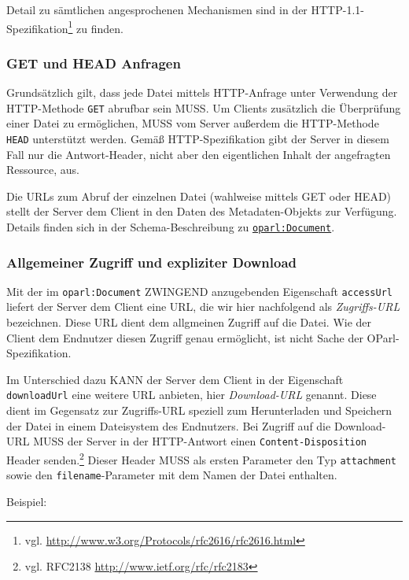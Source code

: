 \documentclass[,a4paper]{article}
\begin{document}
Detail zu sämtlichen angesprochenen Mechanismen sind in der
HTTP-1.1-Spezifikation\footnote{vgl.
  \url{http://www.w3.org/Protocols/rfc2616/rfc2616.html}} zu finden.

\subsubsection{GET und HEAD Anfragen}\label{get-und-head-anfragen}

Grundsätzlich gilt, dass jede Datei mittels HTTP-Anfrage unter
Verwendung der HTTP-Methode \texttt{GET} abrufbar sein MUSS. Um Clients
zusätzlich die Überprüfung einer Datei zu ermöglichen, MUSS vom Server
außerdem die HTTP-Methode \texttt{HEAD} unterstützt werden. Gemäß
HTTP-Spezifikation gibt der Server in diesem Fall nur die
Antwort-Header, nicht aber den eigentlichen Inhalt der angefragten
Ressource, aus.

Die URLs zum Abruf der einzelnen Datei (wahlweise mittels GET oder HEAD)
stellt der Server dem Client in den Daten des Metadaten-Objekts zur
Verfügung. Details finden sich in der Schema-Beschreibung zu
\hyperref[oparlux5fdocument]{\texttt{oparl:Document}}.

\subsubsection{Allgemeiner Zugriff und expliziter
Download}\label{allgemeiner-zugriff-und-expliziter-download}

Mit der im \texttt{oparl:Document} ZWINGEND anzugebenden Eigenschaft
\texttt{accessUrl} liefert der Server dem Client eine URL, die wir hier
nachfolgend als \emph{Zugriffs-URL} bezeichnen. Diese URL dient dem
allgmeinen Zugriff auf die Datei. Wie der Client dem Endnutzer diesen
Zugriff genau ermöglicht, ist nicht Sache der OParl-Spezifikation.

Im Unterschied dazu KANN der Server dem Client in der Eigenschaft
\texttt{downloadUrl} eine weitere URL anbieten, hier \emph{Download-URL}
genannt. Diese dient im Gegensatz zur Zugriffs-URL speziell zum
Herunterladen und Speichern der Datei in einem Dateisystem des
Endnutzers. Bei Zugriff auf die Download-URL MUSS der Server in der
HTTP-Antwort einen \texttt{Content-Disposition} Header senden.\footnote{vgl.
  RFC2138 \url{http://www.ietf.org/rfc/rfc2183}} Dieser Header MUSS als
ersten Parameter den Typ \texttt{attachment} sowie den
\texttt{filename}-Parameter mit dem Namen der Datei enthalten.

Beispiel:
\end{document}
